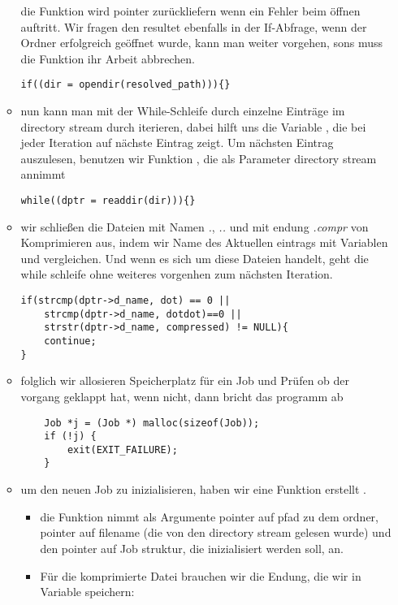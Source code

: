 \begin{itemize}
\begin{itemize}
		die Funktion wird  pointer zurückliefern wenn ein Fehler beim öffnen auftritt.
		Wir fragen den resultet ebenfalls in der If-Abfrage, wenn der Ordner erfolgreich geöffnet wurde,
		kann man weiter vorgehen, sons muss die Funktion  ihr Arbeit abbrechen.
\begin{lstlisting}
if((dir = opendir(resolved_path))){}
	\end{lstlisting}
		\item nun kann man mit der While-Schleife durch einzelne Einträge im directory stream durch iterieren,
		dabei hilft uns die Variable , die bei jeder Iteration auf nächste Eintrag zeigt.
		Um nächsten Eintrag auszulesen, benutzen wir Funktion  ,
		die als Parameter directory stream annimmt
\begin{lstlisting}
while((dptr = readdir(dir))){}
\end{lstlisting}
		\item wir schließen die Dateien mit Namen \textit{.}, \textit{..} und mit endung \textit{.compr}
		von Komprimieren aus,
		indem wir Name des Aktuellen eintrags mit Variablen  und  vergleichen.
		Und wenn es sich um diese Dateien handelt, geht die while schleife
		ohne weiteres vorgenhen zum nächsten Iteration.
\begin{lstlisting}
if(strcmp(dptr->d_name, dot) == 0 ||
	strcmp(dptr->d_name, dotdot)==0 ||
	strstr(dptr->d_name, compressed) != NULL){
	continue;
}
\end{lstlisting}
	\item folglich wir allosieren Speicherplatz für ein Job und Prüfen ob der vorgang geklappt hat,
	wenn nicht, dann bricht das programm ab
\begin{lstlisting}
	Job *j = (Job *) malloc(sizeof(Job));
	if (!j) {
		exit(EXIT_FAILURE);
	}
\end{lstlisting}
	\item um den neuen Job zu inizialisieren, haben wir eine Funktion erstellt
	.
	 \begin{itemize}
		 \item die Funktion nimmt als Argumente pointer auf pfad zu dem ordner, pointer auf filename
	 (die von den directory stream gelesen  wurde) und den pointer auf Job struktur,
	 die inizialisiert werden soll, an.
	 \item Für die komprimierte Datei brauchen wir die Endung, die wir in Variable speichern:

\end{itemize}
\end{itemize}
\end{itemize}
